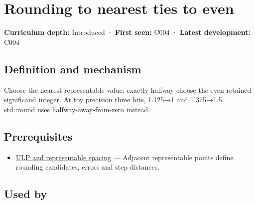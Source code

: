 \hypertarget{appendix-614afe1de592}{}\label{referencestart:appendix-614afe1de592}
\section{Rounding to nearest ties to even}\label{appendix-614afe1de592-rounding-to-nearest-ties-to-even}

\hypertarget{appendix-614afe1de592-rounding-to-nearest-ties-to-even}{}

\textbf{Curriculum depth:} Introduced · \textbf{First seen:} C004 · \textbf{Latest development:} C004

\begin{allmightroledefinition}

\subsection{Definition and mechanism}\label{appendix-614afe1de592-definition-and-mechanism}

\hypertarget{appendix-614afe1de592-definition-and-mechanism}{}

Choose the nearest representable value; exactly halfway choose the even retained significand integer. At toy precision three bits, 1.125→1 and 1.375→1.5. std::round uses halfway-away-from-zero instead.

\end{allmightroledefinition}

\subsection{Prerequisites}\label{appendix-614afe1de592-prerequisites}

\hypertarget{appendix-614afe1de592-prerequisites}{}

\begin{itemize}
\tightlist
\item
  \hyperref[appendix-14bab4cab9d4]{ULP and representable spacing} --- Adjacent representable points define rounding candidates, errors and step distances.
\end{itemize}

\subsection{Used by}\label{appendix-614afe1de592-used-by}

\hypertarget{appendix-614afe1de592-used-by}{}


